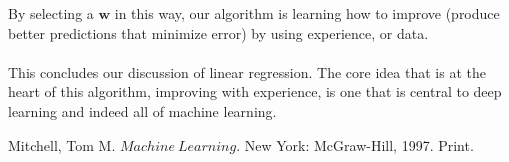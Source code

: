 \documentclass[a4paper]{article}
\begin{document}
\noindent By selecting a $\bm{w}$ in this way, our algorithm is learning how to improve (produce better predictions that minimize error) by using experience, or data. 
\\ \\
\noindent This concludes our discussion of linear regression. The core idea that is at the heart of this algorithm, improving with experience, is one that is central to deep learning and indeed all of machine learning.




\begin{thebibliography}{50}

Mitchell, Tom M. $Machine\ Learning.$ New York: McGraw-Hill, 1997. Print.


\end{thebibliography}
\end{document}
